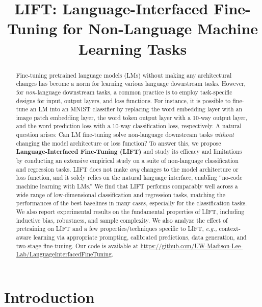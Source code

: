 \title{LIFT: Language-Interfaced Fine-Tuning for Non-Language Machine Learning Tasks}

\begin{abstract}
Fine-tuning pretrained language models (LMs) without making any architectural changes has become a norm for learning various language downstream tasks. However, for \emph{non}-language downstream tasks, a common practice is to employ task-specific designs for input, output layers, and loss functions. For instance, it is possible to fine-tune an LM into an MNIST classifier by replacing the word embedding layer with an image patch embedding layer, the word token output layer with a 10-way output layer, and the word prediction loss with a 10-way classification loss, respectively. A natural question arises: Can LM fine-tuning solve non-language downstream tasks \emph{without} changing the model architecture or loss function? To answer this, we propose \textbf{Language-Interfaced Fine-Tuning (\textsc{LIFT})} and study its efficacy and limitations by conducting an extensive empirical study on a suite of non-language classification and regression tasks.
\textsc{LIFT} does not make {\it any} changes to the model architecture or loss function, and it solely relies on the natural language interface, enabling ``no-code machine learning with LMs.'' We find that \textsc{LIFT} performs comparably well across a wide range of low-dimensional classification and regression tasks, matching the performances of the best baselines in many cases, especially for the classification tasks. We also report experimental results on the fundamental properties of \textsc{LIFT}, including inductive bias, robustness, and sample complexity. We also analyze the effect of pretraining on \textsc{LIFT} and a few properties/techniques specific to \textsc{LIFT}, \textit{e.g.,} context-aware learning via appropriate prompting, calibrated predictions, data generation, and two-stage fine-tuning. Our code is available at \url{https://github.com/UW-Madison-Lee-Lab/LanguageInterfacedFineTuning}.
\end{abstract}

\section{Introduction}\label{sec:introduction}


